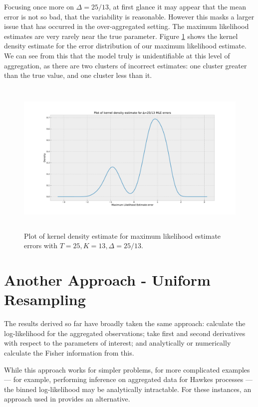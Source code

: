 \documentclass[11pt,a4,twosided,singlespacing,titlepagenumber=on,numbers=endperiod]{scrreprt}
\numberwithin{equation}{chapter} %
\theoremstyle{remark}
\begin{document}
Focusing once more on $\Delta=25/13$, at first glance it may appear that the mean error is not so bad, that the variability is reasonable. However this masks a larger issue that has occurred in the over-aggregated setting. The maximum likelihood estimates are very rarely near the true parameter. Figure \ref{fig:overaggregated_error_kde} shows the kernel density estimate for the error distribution of our maximum likelihood estimate. We can see from this that the model truly is unidentifiable at this level of aggregation, as there are two clusters of incorrect estimates: one cluster greater than the true value, and one cluster less than it.
\begin{figure}[!h]
	\includegraphics[height=7.5cm, width=14cm]{overaggregated_error_kde.pdf}
	\centering
	\caption{Plot of kernel density estimate for maximum likelihood estimate errors with $T=25,K=13,\Delta=25/13$.}
	\label{fig:overaggregated_error_kde}
\end{figure}
\chapter{Another Approach - Uniform Resampling}\label{chapter:resampling}
The results derived so far have broadly taken the same approach: calculate the log-likelihood for the aggregated observations; take first and second derivatives with respect to the parameters of interest; and analytically or numerically calculate the Fisher information from this.

While this approach works for simpler problems, for more complicated examples --- for example, performing inference on aggregated data for Hawkes processes --- the binned log-likelihood may be analytically intractable. For these instances, an approach used in \cite{uniform_resampling} provides an alternative.
\end{document}
